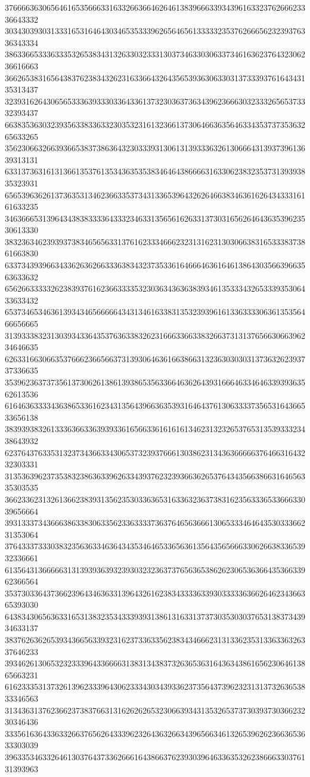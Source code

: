 37666636306564616535666331633266366462646138396663393439616332376266623336643332
30343039303133316531646430346535333962656465613333323537626665623239376336343334
38633665333633353265383431326330323331303734633030633734616362376432306236616663
36626538316564383762383432623163366432643565393630633031373339376164343135313437
32393162643065653336393330336433613732303637363439623666303233326565373332393437
66383536303239356338336332303532316132366137306466363564633435373735363265633265
35623066326639366538373863643230333931306131393336326130666431393739613639313131
63313736316131366135376135343635353834646438666631633062383235373139393835323931
65653963626137363531346236633537343133653964326264663834636162643433316161633235
34636665313964343838333364333234633135656162633137303165626464363539623530613330
38323634623939373834656563313761623334666232313162313030663831653338373861663830
63373439396634336263626633363834323735336164666463616461386430356639663563633632
65626633333262383937616236633335323036343636383934613533343265333935306433633432
65373465346361393434656666643431346163383135323939616133633330636135356466656665
31393338323130393433643537636338326231666336633832663731313765663066396234646635
62633166306635376662366566373139306463616638663132363030303137363262393737336635
35396236373735613730626138613938653563366463626439316664633464633939363562613536
61646363333436386533616234313564396636353931646437613063333735653164366533656138
38393938326133363663363939336165663361616161346231323265376531353933323438643932
62376437633531323734366334306537323937666130386231343636666637646631643232303331
31353639623735383238636339626334393762323936636265376434356638663164656335303535
36623362313261366238393135623530336365316336323637383162356333653366633039656664
39313337343666386338306335623363333736376465636661306533346464353033366231353064
37643337333038323563633463643435346465336563613564356566633062663833653932336661
61356431366666313139393639323930323236373765636538626230653636643536633962366564
35373033643736623964346363313964326162383433336339303333363662646234366365393030
64383430656363316531383235343339393138613163313737303530303765313837343934633137
38376263626539343665633932316237336335623834346662313133623531336336326337646233
39346261306532323339643366663138313438373263653631643634386165623064613865663231
61623335313732613962333964306233343034393362373564373962323131373263653833346563
31343631376236623738376631316262626532306639343135326537373039373036623230346436
33356163643363326637656264333962326436326634396566346132653962623663653633303039
39633534633264613037643733626661643866376239303964633635326238666330376131393963

